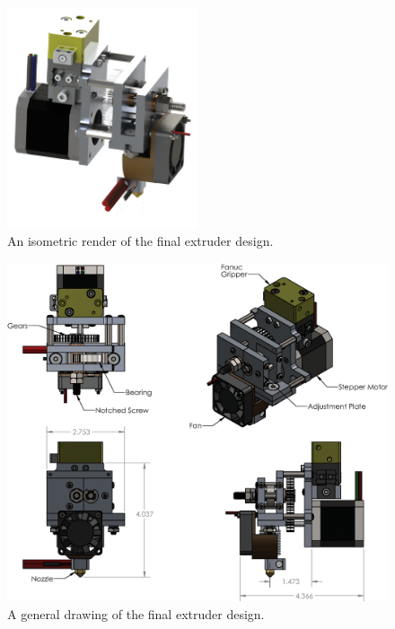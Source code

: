 \begin{figure}[h!]
\centering
\includegraphics[width=0.5\textwidth]{./figures/extruder-iso}
\caption{An isometric render of the final extruder design.}
\label{fig:extruder iso}
\end{figure}



\begin{figure}[h!]
\centering
\includegraphics[width=1\textwidth]{./figures/extruder-drawing}
\caption{A general drawing of the final extruder design.}
\label{fig:extruder drawing}
\end{figure}

